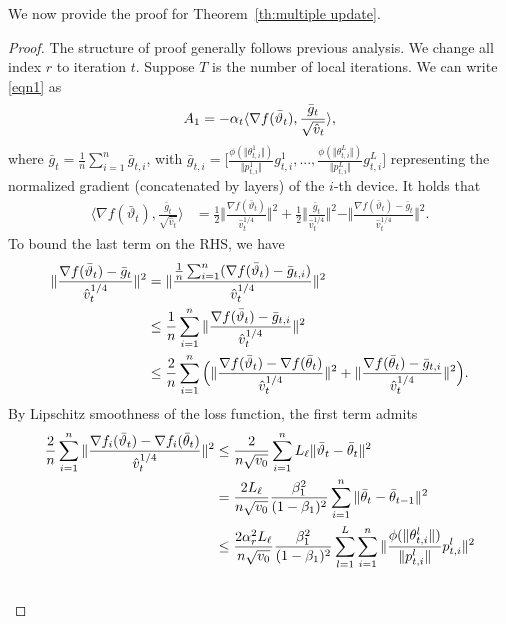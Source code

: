 \documentclass[11pt]{article}
\begin{document}
We now provide the proof for Theorem~\ref{th:multiple update}.
\begin{proof}
The structure of proof generally follows previous analysis. We change all index $r$ to iteration $t$. Suppose $T$ is the number of local iterations. We can write \eqref{eqn1} as
\begin{align}\notag
    A_1=-\alpha_t \langle \nabla f(\bar \vartheta_t),\frac{\bar g_t}{\sqrt{\hat v_t}} \rangle,
\end{align}
where $\bar g_t=\frac{1}{n}\sum_{i=1}^n \bar g_{t,i}$, with $\bar g_{t,i}=\Big[\frac{\phi(\Vert \theta_{t,i}^1\Vert)}{\Vert p_{t,i}^1\Vert}g_{t,i}^1,..., \frac{\phi(\Vert \theta_{t,i}^L\Vert)}{\Vert p_{t,i}^L\Vert}g_{t,i}^L   \Big]$ representing the normalized gradient (concatenated by layers) of the $i$-th device. It holds that
\begin{align}
    \langle \nabla f(\bar \vartheta_t),\frac{\bar g_t}{\sqrt{\hat v_t}} \rangle&=\frac{1}{2}\Vert \frac{\nabla f(\bar\vartheta_t) }{\hat v_t^{1/4}}\Vert^2+\frac{1}{2}\Vert \frac{\bar g_t }{\hat v_t^{1/4}}\Vert^2-\Vert \frac{\nabla f(\bar\vartheta_t)-\bar g_t }{\hat v_t^{1/4}}\Vert^2.  \label{eqn:x1}
\end{align}
To bound the last term on the RHS, we have
\begin{align}\notag
    \Vert \frac{\nabla f(\bar\vartheta_t)-\bar g_t }{\hat v_t^{1/4}}\Vert^2&=\Vert \frac{\frac{1}{n}\sum_{i=1}^n (\nabla f(\bar\vartheta_t)-\bar g_{t,i})}{\hat v_t^{1/4}} \Vert^2\\\notag
    &\leq \frac{1}{n}\sum_{i=1}^n\Vert \frac{\nabla f(\bar\vartheta_t)-\bar g_{t,i}}{\hat v_t^{1/4}} \Vert^2\\\notag
    &\leq \frac{2}{n}\sum_{i=1}^n \Big(\Vert \frac{\nabla f(\bar\vartheta_t)-\nabla f(\bar\theta_t)}{\hat v_t^{1/4}} \Vert^2+\Vert \frac{\nabla f(\bar\theta_t)-\bar g_{t,i}}{\hat v_t^{1/4}} \Vert^2  \Big). 
\end{align}
By Lipschitz smoothness of the loss function, the first term admits
\begin{align}\notag
    \frac{2}{n}\sum_{i=1}^n\Vert \frac{\nabla f_i(\bar\vartheta_t)-\nabla f_i(\bar\theta_t)}{\hat v_t^{1/4}} \Vert^2&\leq \frac{2}{n \sqrt{v_0}}\sum_{i=1}^n L_\ell\Vert \bar\vartheta_t-\bar\theta_t\Vert^2  \\\notag
    &=\frac{2L_\ell}{n \sqrt{v_0}}\frac{\beta_1^2}{(1-\beta_1)^2}\sum_{i=1}^n \Vert \bar\theta_t-\bar\theta_{t-1}\Vert ^2\\\notag
    &\leq \frac{2\alpha_r^2 L_\ell }{n \sqrt{v_0}}\frac{\beta_1^2}{(1-\beta_1)^2} \sum_{l=1}^L \sum_{i=1}^n\Vert \frac{\phi(\Vert \theta_{t,i}^l\Vert)}{\Vert p_{t,i}^l\Vert}p_{t,i}^l \Vert^2\\\notag

\end{align}
\end{proof}
\end{document}
